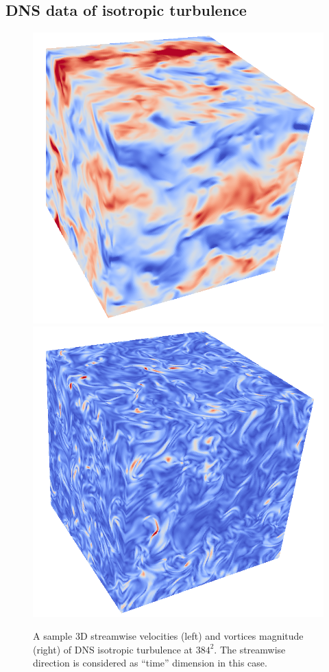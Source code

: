 \subsection{DNS data of isotropic turbulence}
\label{sec:data_isotropic}
\begin{figure}[t]
	\centering
	\includegraphics[width=0.45\columnwidth]{./images/datstats/isotropic/velocity_x_3D.png}
	\includegraphics[width=0.45\columnwidth]{./images/datstats/isotropic/vortices3D.png}
	\caption{\label{fig:vortices3D} A sample 3D streamwise velocities (left) and vortices magnitude (right) of DNS isotropic turbulence at $ 384^2 $. The streamwise direction is considered as ``time'' dimension in this case. }
\end{figure}

